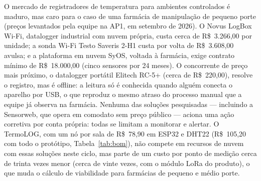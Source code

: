 O mercado de registradores de temperatura para ambientes controlados é
maduro, mas caro para o caso de uma farmácia de manipulação de pequeno
porte (preços levantados pela equipe na AP1, em setembro de 2026). O Novus LogBox Wi-Fi, datalogger industrial com nuvem própria,
custa cerca de R\$~3.266,00 por unidade; a sonda Wi-Fi Testo Saveris
2-H1 custa por volta de R\$~3.608,00 avulsa; e a plataforma em nuvem
SyOS, voltada à farmácia, exige contrato mínimo de R\$~18.000,00 (cinco
sensores por 24 meses). O concorrente de preço mais próximo, o
datalogger portátil Elitech RC-5+ (cerca de R\$~220,00), resolve o
registro, mas é offline: a leitura só é conhecida quando alguém conecta
o aparelho por USB, o que reproduz o mesmo atraso do processo manual
que a equipe já observa na farmácia. Nenhuma das soluções pesquisadas
--- incluindo a Sensorweb, que opera em comodato sem preço público ---
aciona uma ação corretiva por conta própria: todas se limitam a
monitorar e alertar. O TermoLOG, com um nó por sala de R\$~78,90 em
ESP32 e DHT22 (R\$~105,20 com todo o protótipo, Tabela~\ref{tab:bom}),
não compete em recursos de nuvem com essas
soluções neste ciclo, mas parte de um custo por ponto de medição cerca
de trinta vezes menor (cerca de vinte vezes, com o módulo LoRa do
produto), o que muda o cálculo de viabilidade para
farmácias de pequeno e médio porte.
